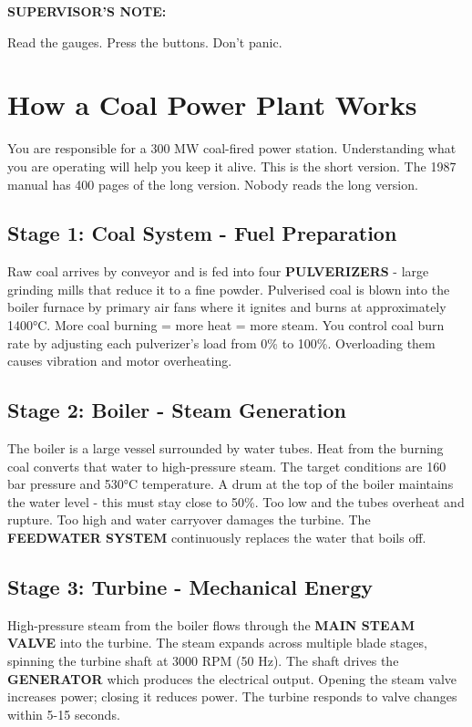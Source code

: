 \documentclass[10pt,a5paper]{article}
\newenvironment{notebox}{%
  \vspace{4pt}%
  \textbf{SUPERVISOR'S NOTE:} \bfseries%
}{%
}
\begin{document}
\begin{notebox}
Read the gauges. Press the buttons. Don't panic.
\end{notebox}

\newpage
\section{How a Coal Power Plant Works}

You are responsible for a 300 MW coal-fired power station. Understanding what
you are operating will help you keep it alive. This is the short version. The
1987 manual has 400 pages of the long version. Nobody reads the long version.

\subsection{Stage 1: Coal System - Fuel Preparation}

Raw coal arrives by conveyor and is fed into four \textbf{PULVERIZERS} - large
grinding mills that reduce it to a fine powder. Pulverised coal is blown into
the boiler furnace by primary air fans where it ignites and burns at
approximately 1400°C. More coal burning = more heat = more steam. You control
coal burn rate by adjusting each pulverizer's load from 0\% to 100\%.
Overloading them causes vibration and motor overheating.

\subsection{Stage 2: Boiler - Steam Generation}

The boiler is a large vessel surrounded by water tubes. Heat from the burning
coal converts that water to high-pressure steam. The target conditions are
160 bar pressure and 530°C temperature. A drum at the top of the boiler
maintains the water level - this must stay close to 50\%. Too low and the
tubes overheat and rupture. Too high and water carryover damages the turbine.
The \textbf{FEEDWATER SYSTEM} continuously replaces the water that boils off.

\subsection{Stage 3: Turbine - Mechanical Energy}

High-pressure steam from the boiler flows through the \textbf{MAIN STEAM VALVE}
into the turbine. The steam expands across multiple blade stages, spinning the
turbine shaft at 3000 RPM (50 Hz). The shaft drives the \textbf{GENERATOR}
which produces the electrical output. Opening the steam valve increases power;
closing it reduces power. The turbine responds to valve changes within 5-15
seconds.
\end{document}

